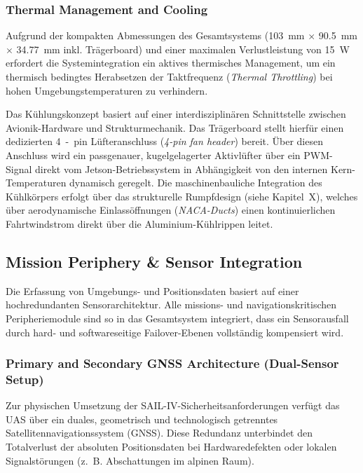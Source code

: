 \subsubsection{Thermal Management and Cooling}
\label{sec:thermal_management_cooling}

Aufgrund der kompakten Abmessungen des Gesamtsystems (\SI{103}{\mm} $\times$ \SI{90.5}{\mm} $\times$ \SI{34.77}{\mm} inkl. Trägerboard) und einer maximalen Verlustleistung von \SI{15}{\W} erfordert die Systemintegration ein aktives thermisches Management, 
um ein thermisch bedingtes Herabsetzen der Taktfrequenz (\textit{Thermal Throttling}) bei hohen Umgebungstemperaturen zu verhindern.

Das Kühlungskonzept basiert auf einer interdisziplinären Schnittstelle zwischen Avionik-Hardware und Strukturmechanik. Das Trägerboard stellt hierfür einen dedizierten \SI{4}{-pin} Lüfteranschluss (\textit{4-pin fan header}) bereit. 
Über diesen Anschluss wird ein passgenauer, kugelgelagerter Aktivlüfter über ein PWM-Signal direkt vom Jetson-Betriebssystem in Abhängigkeit von den internen Kern-Temperaturen dynamisch geregelt. 
Die maschinenbauliche Integration des Kühlkörpers erfolgt über das strukturelle Rumpfdesign (siehe Kapitel~X), welches über aerodynamische Einlassöffnungen (\textit{NACA-Ducts}) einen kontinuierlichen Fahrtwindstrom direkt über die Aluminium-Kühlrippen leitet.


\subsection{Mission Periphery \texorpdfstring{\&}{\&} Sensor Integration}
\label{sec:mission_periphery_sensor_integration}

Die Erfassung von Umgebungs- und Positionsdaten basiert auf einer hochredundanten Sensorarchitektur. Alle missions- und navigationskritischen Peripheriemodule sind so in das Gesamtsystem integriert, 
dass ein Sensorausfall durch hard- und softwareseitige Failover-Ebenen vollständig kompensiert wird.

\subsubsection{Primary and Secondary GNSS Architecture (Dual-Sensor Setup)}
\label{sec:gnss_architecture}

Zur physischen Umsetzung der SAIL-IV-Sicherheitsanforderungen verfügt das UAS über ein duales, geometrisch und technologisch getrenntes Satellitennavigationssystem (GNSS). 
Diese Redundanz unterbindet den Totalverlust der absoluten Positionsdaten bei Hardwaredefekten oder lokalen Signalstörungen (z.~B. Abschattungen im alpinen Raum).

